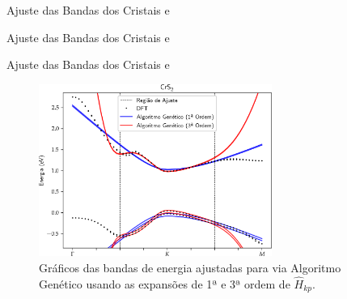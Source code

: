 \begin{frame}{Ajuste das Bandas dos Cristais  e }
  \begin{table}
    \resizebox*{0.58\textwidth}{!}{}
    \caption{
      Parâmetros da Hamiltoniana $ \hat{H}_{kp} $ ajustados para 
      usando as expansões de 1ª e 3ª ordem, bem como os valores para a função
      objetivo $f$ correspondente.
    }
  \end{table}
\end{frame}

\begin{frame}{Ajuste das Bandas dos Cristais  e }
  \begin{table}
    \resizebox*{0.58\textwidth}{!}{}
    \caption{
      Parâmetros da Hamiltoniana $ \hat{H}_{kp} $ ajustados para 
      usando as expansões de 1ª e 3ª ordem, bem como os valores para a função
      objetivo $f$ correspondente.
    }
  \end{table}
\end{frame}

\begin{frame}{Ajuste das Bandas dos Cristais  e }
  \begin{figure}
    \centering
    \includegraphics[width=0.68\textwidth]{imagens/crs2_genetic_algorithm_order_13.png}
    \caption{
      Gráficos das bandas de energia ajustadas para  via Algoritmo Genético
      usando as expansões de 1ª e 3ª ordem de $ \hat{H}_{kp} $.
    }
  \end{figure}
\end{frame}

